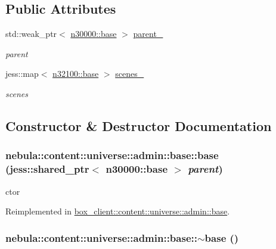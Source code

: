 \subsection*{Public Attributes}
\begin{DoxyCompactItemize}
\item 
std::weak\_\-ptr$<$ \hyperlink{classnebula_1_1content_1_1base}{n30000::base} $>$ \hyperlink{classnebula_1_1content_1_1universe_1_1admin_1_1base_a85bfa37d873de311c7dae48064586698}{parent\_\-}
\begin{DoxyCompactList}\small\item\em parent \item\end{DoxyCompactList}\item 
jess::map$<$ \hyperlink{classnebula_1_1content_1_1scene_1_1admin_1_1base}{n32100::base} $>$ \hyperlink{classnebula_1_1content_1_1universe_1_1admin_1_1base_a5c7a0e365fdf2bec2f46f20265e55af1}{scenes\_\-}
\begin{DoxyCompactList}\small\item\em scenes \item\end{DoxyCompactList}\end{DoxyCompactItemize}


\subsection{Constructor \& Destructor Documentation}
\hypertarget{classnebula_1_1content_1_1universe_1_1admin_1_1base_a51a5e35a87bec6f83bf42ce118011fda}{
\subsubsection[{base}]{\setlength{\rightskip}{0pt plus 5cm}nebula::content::universe::admin::base::base (jess::shared\_\-ptr$<$ {\bf n30000::base} $>$ {\em parent})}}
\label{classnebula_1_1content_1_1universe_1_1admin_1_1base_a51a5e35a87bec6f83bf42ce118011fda}


ctor 

Reimplemented in \hyperlink{classbox__client_1_1content_1_1universe_1_1admin_1_1base_a85bffca5e38b5fa3e24d8608b2a00166}{box\_\-client::content::universe::admin::base}.\hypertarget{classnebula_1_1content_1_1universe_1_1admin_1_1base_a6982e2e195385a8a9452c457566decbc}{
\subsubsection[{$\sim$base}]{\setlength{\rightskip}{0pt plus 5cm}nebula::content::universe::admin::base::$\sim$base ()}}
\label{classnebula_1_1content_1_1universe_1_1admin_1_1base_a6982e2e195385a8a9452c457566decbc}


